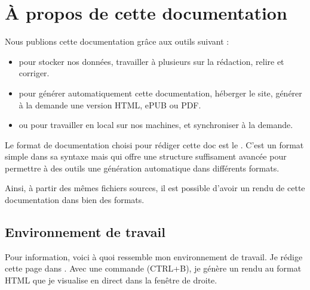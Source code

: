 \documentclass[letterpaper,10pt,french]{sphinxmanual}
\begin{document}
\section{À propos de cette documentation}
\label{\detokenize{projet-aPropos:a-propos-de-cette-documentation}}\label{\detokenize{projet-aPropos::doc}}
Nous publions cette documentation grâce aux outils suivant :
\begin{itemize}
\item {} 
 pour stocker nos données, travailler à plusieurs sur la rédaction,
relire et corriger.

\item {} 
 pour générer automatiquement cette documentation, héberger le site,
générer à la demande une version HTML, ePUB ou PDF.

\item {} 
  ou   pour travailler en local sur nos machines, et synchroniser à la demande.

\end{itemize}

Le format de documentation choisi pour rédiger cette doc est le .
C’est un format  simple dans sa syntaxe mais qui offre une structure
suffisament avancée pour permettre à des outils une génération automatique dans différents
formats.

Ainsi, à partir des mêmes fichiers sources, il est possible d’avoir un rendu de cette
documentation dans bien des formats.


\subsection{Environnement de travail}
\label{\detokenize{projet-aPropos:environnement-de-travail}}
Pour information, voici à quoi ressemble mon environnement de travail.
Je rédige cette page dans . Avec une commande (CTRL+B), je génère un rendu
au format HTML que je visualise en direct dans la fenêtre de droite.

\end{document}
